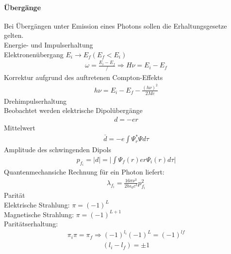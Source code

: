 \documentclass[10pt,a4paper]{article}
\begin{document}
\paragraph{Übergänge}$\,$ \\
Bei Übergängen unter Emission eines Photons sollen die Erhaltungsgesetze gelten.\\
Energie- und Impulserhaltung \\
Elektronenübergang $ E_i \rightarrow E_f (E_f<E_i)$
\begin{align}
\omega=\frac{E_i-E_f}{\slash} \Rightarrow H \nu = E_i-E_f
\end{align}
Korrektur aufgrund des auftretenen Compton-Effekts
\begin{align}
h \nu= E_i-E_f-\frac{(h \nu)^2}{2Mc}
\end{align}
Drehimpulserhaltung \\
Beobachtet werden elektrische Dipolübergänge
\begin{align}
d=-er
\end{align}
Mittelwert
\begin{align}
\bar{d}=-e \int \Psi_r^* \Psi d\tau
\end{align}
Amplitude des schwingenden Dipols
\begin{align}
p_{f_i}=\vert d \vert = \vert \int \Psi_f(r) e r \Psi_i(r) d \tau \vert
\end{align}
Quantenmechansiche Rechnung für ein Photon liefert:
\begin{align}
\lambda_{f_i}=\frac{16 \pi \nu^3}{2 h \epsilon_0 c^3} p_{f_i}^2
\end{align}
Parität\\
Elektrische Strahlung: $\pi=(-1)^L$ \\
Magnetische Strahlung: $\pi=(-1)^{L+1}$ \\
Paritätserhaltung:
\begin{align}
\pi_i \pi= \pi_f \Rightarrow (-1)^{l_i}(-1)^L=(-1)^{lf}
\end{align}
\begin{align}
(l_i-l_f)= \pm 1
\end{align}
\end{document}
